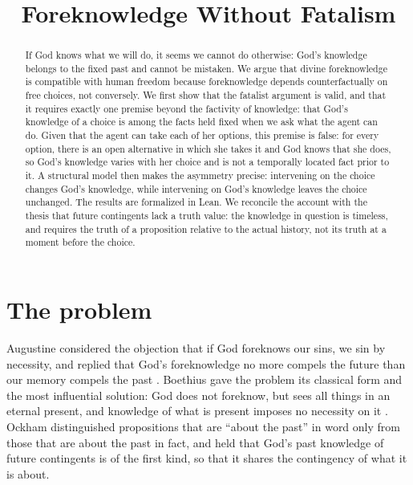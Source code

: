 \documentclass{situationist-preprint}
\title{Foreknowledge Without Fatalism}
\begin{document}
\maketitle

\begin{abstract}
If God knows what we will do, it seems we cannot do otherwise: God's knowledge belongs to the fixed past and cannot be mistaken. We argue that divine foreknowledge is compatible with human freedom because foreknowledge depends counterfactually on free choices, not conversely. We first show that the fatalist argument is valid, and that it requires exactly one premise beyond the factivity of knowledge: that God's knowledge of a choice is among the facts held fixed when we ask what the agent can do. Given that the agent can take each of her options, this premise is false: for every option, there is an open alternative in which she takes it and God knows that she does, so God's knowledge varies with her choice and is not a temporally located fact prior to it. A structural model then makes the asymmetry precise: intervening on the choice changes God's knowledge, while intervening on God's knowledge leaves the choice unchanged. The results are formalized in Lean. We reconcile the account with the thesis that future contingents lack a truth value: the knowledge in question is timeless, and requires the truth of a proposition relative to the actual history, not its truth at a moment before the choice.
\end{abstract}

\section{The problem}

Augustine considered the objection that if God foreknows our sins, we sin by necessity, and replied that God's foreknowledge no more compels the future than our memory compels the past \citep[III]{AugustineLibero}. Boethius gave the problem its classical form and the most influential solution: God does not foreknow, but sees all things in an eternal present, and knowledge of what is present imposes no necessity on it \citep[V]{Boethius}. Ockham distinguished propositions that are \enquote{about the past} in word only from those that are about the past in fact, and held that God's past knowledge of future contingents is of the first kind, so that it shares the contingency of what it is about.
\end{document}
